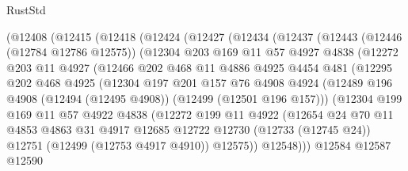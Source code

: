 \begin{lexlean}{RustStd}
\begin{coremodule}
{\begin{coremodule}
{{{{{{{{{{{{{{{{{{{{{{{{{{{{{{{{{{{{{{{{{{{{{{{{{{{{{{{{{{{{{{{{{{{{{{{{{{{{{{{{    (@12408
      (@12415
        (@12418
          (@12424
            (@12427
              (@12434
                (@12437
                  (@12443
                    (@12446 (@12784 @12786 @12575))
                    (@12304
                      @203
                      @169
                      @11
                      @57
                      @4927
                      @4838
                      (@12272
                        @203
                        @11
                        @4927
                        (@12466
                          @202
                          @468
                          @11
                          @4886
                          @4925
                          @4454
                          @481
                          (@12295
                            @202
                            @468
                            @4925
                            (@12304
                              @197
                              @201
                              @157
                              @76
                              @4908
                              @4924
                              (@12489
                                @196
                                @4908
                                (@12494 (@12495 @4908))
                                (@12499 (@12501 @196 @157)))
                              (@12304
                                @199
                                @169
                                @11
                                @57
                                @4922
                                @4838
                                (@12272
                                  @199
                                  @11
                                  @4922
                                  (@12654
                                    @24
                                    @70
                                    @11
                                    @4853
                                    @4863
                                    @31
                                    @4917
                                    @12685
                                    @12722
                                    @12730
                                    (@12733 (@12745 @24))
                                    @12751
                                    (@12499 (@12753 @4917 @4910))
                                    @12575))
                                @12548)))
                          @12584
                          @12587
                          @12590
}}}}}}}}}}}}}}}}}}}}}}}}}}}}}}}}}}}}}}}}}}}}}}}}}}}}}}}}}}}}}}}}}}}}}}}}}}}}}}}}
\end{coremodule}}
\end{coremodule}
\end{lexlean}
